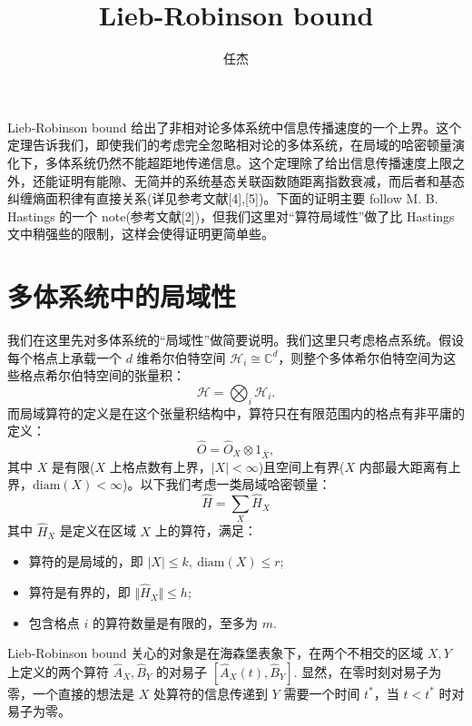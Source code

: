 \documentclass[10pt,UTF8]{ctexart}
\begin{document}
\title{Lieb-Robinson bound}
\author{任杰}
\date{}

\maketitle
\noindent
Lieb-Robinson bound 给出了非相对论多体系统中信息传播速度的一个上界。这个定理告诉我们，即使我们的考虑完全忽略相对论的多体系统，在局域的哈密顿量演化下，多体系统仍然不能超距地传递信息。这个定理除了给出信息传播速度上限之外，还能证明有能隙、无简并的系统基态关联函数随距离指数衰减，而后者和基态纠缠熵面积律有直接关系(详见参考文献[4],[5])。下面的证明主要 follow M. B. Hastings 的一个 note(参考文献[2])，但我们这里对“算符局域性”做了比 Hastings 文中稍强些的限制，这样会使得证明更简单些。

\section*{多体系统中的局域性}
\noindent
我们在这里先对多体系统的“局域性”做简要说明。我们这里只考虑格点系统。假设每个格点上承载一个 $d$ 维希尔伯特空间 $\mathcal H_i \cong \mathbb{C}^d$，则整个多体希尔伯特空间为这些格点希尔伯特空间的张量积：
\begin{equation}
	\mathcal H = \bigotimes_{i} \mathcal{H}_i.
\end{equation}
而局域算符的定义是在这个张量积结构中，算符只在有限范围内的格点有非平庸的定义：
\begin{equation}
	\hat O = \hat{O}_X \otimes 1_{\bar X},
\end{equation}
其中 $X$ 是有限($X$ 上格点数有上界，$|X|<\infty$)且空间上有界($X$ 内部最大距离有上界，$\mathrm{diam}(X)<\infty$)。以下我们考虑一类局域哈密顿量：
\begin{equation}
	\hat H = \sum_X \hat H_{X}
\end{equation}
其中 $\hat H_X$ 是定义在区域 $X$ 上的算符，满足：
\begin{itemize}
	\item 算符的是局域的，即 $|X| \le k,\ \mathrm{diam}(X) \le r$;
	\item 算符是有界的，即 $\Vert \hat H_X \Vert \le h$;
	\item 包含格点 $i$ 的算符数量是有限的，至多为 $m$.
\end{itemize}
Lieb-Robinson bound 关心的对象是在海森堡表象下，在两个不相交的区域 $X,Y$ 上定义的两个算符 $\hat{A}_X,\hat{B}_Y$ 的对易子 $[\hat A_X(t),\hat B_Y]$. 显然，在零时刻对易子为零，一个直接的想法是 $X$ 处算符的信息传递到 $Y$ 需要一个时间 $t^*$，当 $t<t^*$ 时对易子为零。
\end{document}
